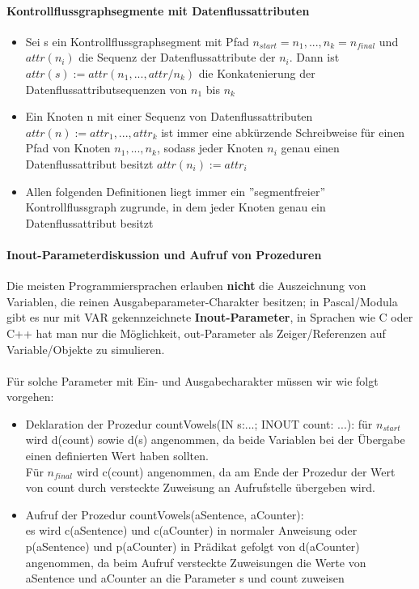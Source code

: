 \paragraph{Kontrollflussgraphsegmente mit Datenflussattributen}
\begin{itemize}
	\item Sei s ein Kontrollflussgraphsegment mit Pfad $n_{start} = n_{1}, ..., n_{k} = n_{final}$ und $attr(n_{i})$ die Sequenz der Datenflussattribute der $n_{i}$. Dann ist $attr(s) := attr(n_{1}, ..., attr/n_{k})$ die Konkatenierung der Datenflussattributsequenzen von $n_1$ bis $n_k$
	\item Ein Knoten n mit einer Sequenz von Datenflussattributen $attr(n) := attr_{1}, ..., attr_{k}$ ist immer eine abkürzende Schreibweise für einen Pfad von Knoten $n_1, ..., n_{k}$, sodass jeder Knoten $n_{i}$ genau einen Datenflussattribut besitzt $attr(n_{i}) := attr_{i}$
	\item Allen folgenden Definitionen liegt immer ein ''segmentfreier'' Kontrollflussgraph zugrunde, in dem jeder Knoten genau ein Datenflussattribut besitzt
\end{itemize}

\paragraph{Inout-Parameterdiskussion und Aufruf von Prozeduren}
Die meisten Programmiersprachen erlauben \textbf{nicht} die Auszeichnung von Variablen, die reinen Ausgabeparameter-Charakter besitzen; in Pascal/Modula gibt es nur mit VAR gekennzeichnete \textbf{Inout-Parameter}, in Sprachen wie C oder C++ hat man nur die Möglichkeit, out-Parameter als Zeiger/Referenzen auf Variable/Objekte zu simulieren.
\\
\\
Für solche Parameter mit Ein- und Ausgabecharakter müssen wir wie folgt vorgehen:
\begin{itemize}
	\item Deklaration der Prozedur countVowels(IN s:...; INOUT count: ...): für $n_{start}$ wird d(count) sowie d(s) angenommen, da beide Variablen bei der Übergabe einen definierten Wert haben sollten. \\
	Für $n_{final}$ wird c(count) angenommen, da am Ende der Prozedur der Wert von count durch versteckte Zuweisung an Aufrufstelle übergeben wird.
	\item Aufruf der Prozedur countVowels(aSentence, aCounter): \\
	es wird c(aSentence) und c(aCounter) in normaler Anweisung oder p(aSentence) und p(aCounter) in Prädikat gefolgt von d(aCounter) angenommen, da beim Aufruf versteckte Zuweisungen die Werte von aSentence und aCounter an die Parameter s und count zuweisen
\end{itemize}

